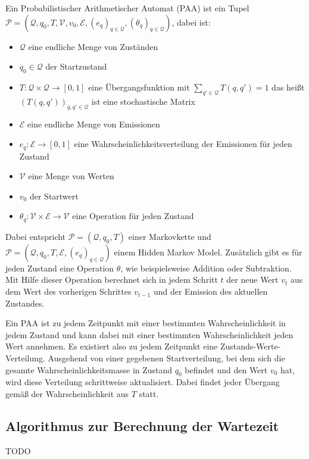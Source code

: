 \begin{definition}[PAA]
 Ein Probabilistischer Arithmetischer Automat (PAA) ist ein Tupel
 $ \mathcal{P} = (\mathcal{Q}, q_0, T, \mathcal{V}, v_0, \mathcal{E}, (e_q)_{q\in\mathcal{Q}}, (\theta_q)_{q\in\mathcal{Q}})$, dabei ist:
 \begin{itemize}
  \item $\mathcal{Q}$ eine endliche Menge von Zuständen
  \item $q_0 \in \mathcal{Q}$ der Startzustand
  \item $T: \mathcal{Q} \times \mathcal{Q} \rightarrow [0,1]$ eine Übergangsfunktion mit $\sum_{q' \in \mathcal{Q}} T(q, q') = 1 $ das heißt $(T(q,q'))_{q,q' \in \mathcal{Q}}$ ist eine stochastische Matrix
  \item $\mathcal{E}$ eine endliche Menge von Emissionen
  \item $e_q: \mathcal{E} \rightarrow [0,1]$ eine Wahrscheinlichkeitsverteilung der Emissionen für jeden Zustand
  \item $\mathcal{V}$ eine Menge von Werten
  \item $v_0$ der Startwert
  \item $\theta_q: \mathcal{V} \times \mathcal{E} \rightarrow \mathcal{V}$ eine Operation für jeden Zustand
 \end{itemize}
\end{definition}
Dabei entspricht $ \mathcal{P} = (\mathcal{Q}, q_0, T)$ einer Markovkette und $ \mathcal{P} = (\mathcal{Q}, q_0, T, \mathcal{E}, (e_q)_{q\in\mathcal{Q}})$ einem Hidden Markov Model. %
Zusätzlich gibt es für jeden Zustand eine Operation $\theta$, wie beispielsweise Addition oder Subtraktion. Mit Hilfe dieser Operation berechnet sich in jedem Schritt $t$ der neue Wert $v_t$ aus dem Wert des vorherigen Schrittes $v_{t-1}$ und der Emission des aktuellen Zustandes.

Ein PAA ist zu jedem Zeitpunkt mit einer bestimmten Wahrscheinlichkeit in jedem Zustand und kann dabei mit einer bestimmten Wahrscheinlichkeit jeden Wert annehmen. Es existiert also zu jedem Zeitpunkt eine Zustands-Werte-Verteilung. Ausgehend von einer gegebenen Startverteilung, bei dem sich die gesamte Wahrscheinlichkeitsmasse in Zustand $q_0$ befindet und den Wert $v_0$ hat, wird diese Verteilung schrittweise aktualisiert. Dabei findet jeder Übergang gemäß der Wahrscheinlichkeit aus $T$ statt. %

% 
% 
% 

\subsection{Algorithmus zur Berechnung der Wartezeit}

TODO